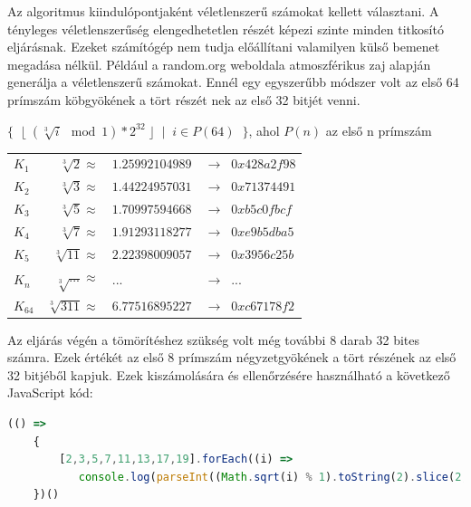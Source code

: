 \bigbreak


Az algoritmus kiindulópontjaként véletlenszerű számokat kellett választani. A tényleges véletlenszerűség elengedhetetlen részét képezi szinte minden titkosító eljárásnak. Ezeket számítógép nem tudja előállítani valamilyen külső bemenet megadása nélkül. Például a random.org weboldala atmoszférikus zaj alapján generálja a véletlenszerű számokat. Ennél egy egyszerűbb módszer volt az első 64 prímszám köbgyökének a tört részét nek az első 32 bitjét venni.


\bigbreak


{\hfil $ \{ \;\; \lfloor \; (\sqrt[3]{i} \mod 1) * 2^{32} \; \rfloor \;\; | \;\; i \in P(64) \;\; \}  $, ahol $P(n)$ az első n prímszám \par}


\bigbreak


\begin{tabular}{lrll}

    $K_1$     &  $\sqrt[3]{2}   \approx$  & $1.25992104989$  &  $\xrightarrow{} \;\; 0x428a2f98$ \\
    $K_2$     &  $\sqrt[3]{3}   \approx$  & $1.44224957031$  &  $\xrightarrow{} \;\; 0x71374491$ \\
    $K_3$     &  $\sqrt[3]{5}   \approx$  & $1.70997594668$  &  $\xrightarrow{} \;\; 0xb5c0fbcf$ \\
    $K_4$     &  $\sqrt[3]{7}   \approx$  & $1.91293118277$  &  $\xrightarrow{} \;\; 0xe9b5dba5$ \\
    $K_5$     &  $\sqrt[3]{11}  \approx$  & $2.22398009057$  &  $\xrightarrow{} \;\; 0x3956c25b$ \\
    $K_n$     &  $\sqrt[3]{...} \approx$  & $...$            &  $\xrightarrow{} \;\; ...$ \\
    $K_{64}$  &  $\sqrt[3]{311} \approx$  & $6.77516895227$  &  $\xrightarrow{} \;\; 0xc67178f2$ \\

\end{tabular}


\bigbreak


Az eljárás végén a tömörítéshez szükség volt még további 8 darab 32 bites számra. Ezek értékét az első 8 prímszám négyzetgyökének a tört részének az első 32 bitjéből kapjuk. Ezek kiszámolására és ellenőrzésére használható a következő JavaScript kód:

\begin{algorithm}
    \begin{lstlisting}[language={JavaScript}]
    (() =>
    {
        [2,3,5,7,11,13,17,19].forEach((i) =>
           console.log(parseInt((Math.sqrt(i) % 1).toString(2).slice(2, 34), 2).toString(16)))
    })()
    \end{lstlisting}
\end{algorithm}

